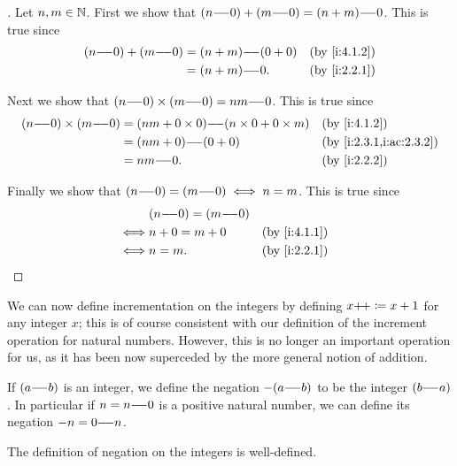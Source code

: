 \begin{proof}[]
  Let \(n, m \in \mathbb{N}\).
  First we show that \((n {-}\!{-} 0) + (m {-}\!{-} 0) = (n + m) {-}\!{-} 0\).
  This is true since
  \begin{align*}
    (n \mm 0) + (m \mm 0) & = (n + m) \mm (0 + 0) &  & \by{i:4.1.2} \\
                          & = (n + m) \mm 0.      &  & \by{i:2.2.1}
  \end{align*}

  Next we show that \((n {-}\!{-} 0) \times (m {-}\!{-} 0) = nm {-}\!{-} 0\).
  This is true since
  \begin{align*}
    (n \mm 0) \times (m \mm 0) & = (nm + 0 \times 0) \mm (n \times 0 + 0 \times m) &  & \by{i:4.1.2}            \\
                               & = (nm + 0) \mm (0 + 0)                            &  & \by{i:2.3.1,i:ac:2.3.2} \\
                               & = nm \mm 0.                                       &  & \by{i:2.2.2}
  \end{align*}

  Finally we show that \((n {-}\!{-} 0) = (m {-}\!{-} 0) \iff n = m\).
  This is true since
  \begin{align*}
         & (n \mm 0) = (m \mm 0)                   \\
    \iff & n + 0 = m + 0         &  & \by{i:4.1.1} \\
    \iff & n = m.                &  & \by{i:2.2.1}
  \end{align*}
\end{proof}

\begin{note}
  We can now define incrementation on the integers by defining \(x{+}\!{+} \coloneqq x + 1\) for any integer \(x\);
  this is of course consistent with our definition of the increment operation for natural numbers.
  However, this is no longer an important operation for us, as it has been now superceded by the more general notion of addition.
\end{note}

\begin{defn}\label{i:4.1.4}
  If \((a {-}\!{-} b)\) is an integer, we define the negation \(-(a {-}\!{-} b)\) to be the integer \((b {-}\!{-} a)\).
  In particular if \(n = n {-}\!{-} 0\) is a positive natural number, we can define its negation \(-n = 0 {-}\!{-} n\).
\end{defn}

\begin{ac}\label{i:ac:4.1.3}
  The definition of negation on the integers is well-defined.
\end{ac}

